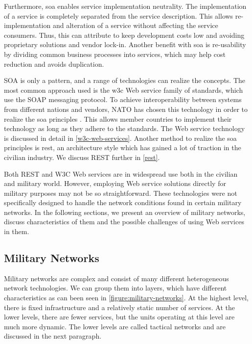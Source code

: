 Furthermore, \gls{soa} enables service implementation neutrality. The
implementation of a service is completely separated from the service
description. This allows re-implementation and alteration of a service without
affecting the service consumers. Thus, this can attribute to keep development
costs low and avoiding proprietary solutions and vendor lock-in. Another
benefit with \gls{soa} is re-usability by dividing common business processes
into services, which may help cost reduction and avoids duplication.

SOA is only a pattern, and a range of technologies can realize the concepts. The
most common approach used is the \gls{w3c} Web service family of standards,
which use the SOAP messaging protocol. To achieve interoperability between
systems from different nations and vendors, NATO has chosen this technology in
order to realize the \gls{soa} principles \cite{soa-baseline}. This allows
member countries to implement their technology as long as they adhere to the
standards. The Web service technology is discussed in detail in
\cref{w3c-web-services}. Another method to realize the \gls{soa} principles is
\gls{rest}, an architecture style which has gained a lot of traction in the
civilian industry. We discuss REST further in \cref{rest}.

Both REST and W3C Web services are in widespread use both in the civilian and
military world. However, employing Web service solutions directly for military
purposes may not be so straightforward. These technologies were not specifically
designed to handle the network conditions found in certain military networks. In
the following sections, we present an overview of military networks, discuss
characteristics of them and the possible challenges of using Web services in
them.

\subsection{Military Networks}

Military networks are complex and consist of many different heterogeneous
network technologies. We can group them into layers, which have different
characteristics as can been seen in \cref{figure:military-networks}. At the
highest level, there is fixed infrastructure and a relatively static number of
services. At the lower levels, there are fewer services, but the units operating
at this level are much more dynamic. The lower levels are called tactical
networks and are discussed in the next paragraph.

